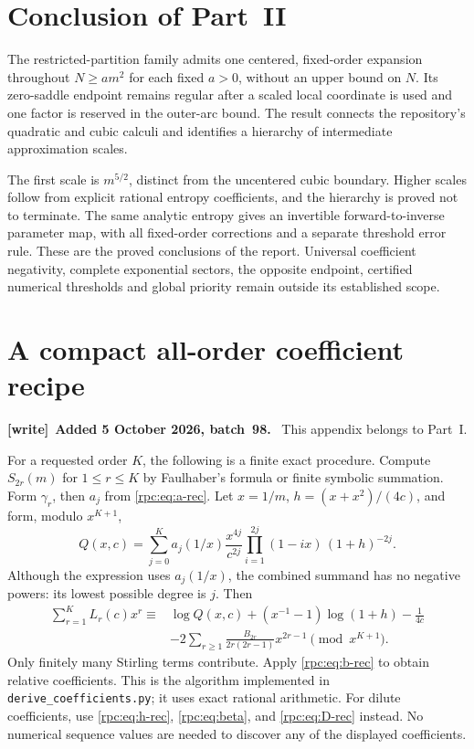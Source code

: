 \documentclass[11pt]{article}
\theoremstyle{definition}
\theoremstyle{remark}
\numberwithin{equation}{section}
\newenvironment{writenote}[1][]{\par\smallskip\begingroup\small
 \noindent\textbf{[write]}\if\relax\detokenize{#1}\relax\else~\textbf{#1.}\fi\ }%
 {\par\endgroup\smallskip}
\begin{document}
\section{Conclusion of Part~II}\label{rpc:cx:sec:conclusion}
The restricted-partition family admits one centered, fixed-order
expansion throughout $N\ge am^2$ for each fixed $a>0$, without an upper
bound on $N$. Its zero-saddle endpoint remains regular after a scaled
local coordinate is used and one factor is reserved in the outer-arc
bound. The result connects the repository's quadratic and cubic
calculi and identifies a hierarchy of intermediate approximation scales.

The first scale is $m^{5/2}$, distinct from the uncentered cubic
boundary. Higher scales follow from explicit rational entropy
coefficients, and the hierarchy is proved not to terminate. The same
analytic entropy gives an invertible forward-to-inverse parameter map,
with all fixed-order corrections and a separate threshold error rule.
These are the proved conclusions of the report. Universal coefficient
negativity, complete exponential sectors, the opposite endpoint,
certified numerical thresholds and global priority remain outside its
established scope.

\setlength{\emergencystretch}{0pt}
\appendix
\section{A compact all-order coefficient recipe}
\begin{writenote}[Added 5 October 2026, batch~98]
This appendix belongs to Part~I.
\end{writenote}

For a requested order $K$, the following is a finite exact procedure.
Compute $S_{2r}(m)$ for $1\le r\le K$ by Faulhaber's formula or finite
symbolic summation. Form $\gamma_r$, then $a_j$ from \eqref{rpc:eq:a-rec}.
Let $x=1/m$, $h=(x+x^2)/(4c)$, and form, modulo $x^{K+1}$,
\[
 Q(x,c)=\sum_{j=0}^K a_j(1/x)
 \frac{x^{4j}}{c^{2j}}\prod_{i=1}^{2j}(1-ix)\,(1+h)^{-2j}.
\]
Although the expression uses $a_j(1/x)$, the combined summand has no negative
powers: its lowest possible degree is $j$. Then
\begin{align*}
 \sum_{r=1}^K L_r(c)x^r\equiv{}&\log Q(x,c)
 +(x^{-1}-1)\log(1+h)-\frac1{4c}\\
 &-2\sum_{r\ge1}\frac{B_{2r}}{2r(2r-1)}x^{2r-1}
                          \pmod{x^{K+1}}.
\end{align*}
Only finitely many Stirling terms contribute. Apply \eqref{rpc:eq:b-rec} to obtain
relative coefficients. This is the algorithm implemented in
\texttt{derive\_coefficients.py}; it uses exact rational arithmetic.
For dilute coefficients, use \eqref{rpc:eq:h-rec}, \eqref{rpc:eq:beta}, and
\eqref{rpc:eq:D-rec} instead. No numerical sequence values are needed to discover
any of the displayed coefficients.
\end{document}
